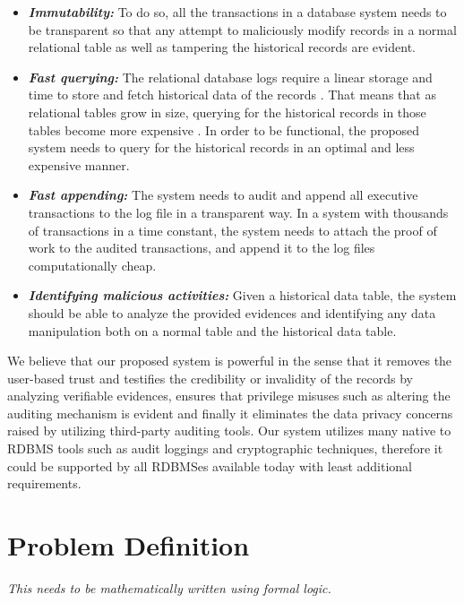 \begin{itemize}
  \item \textbf{\textit{Immutability:}} To do so, all the transactions in a database system needs to be transparent so that any attempt to maliciously modify records in a normal relational table as well as tampering the historical records are evident.
  \item \textbf{\textit{Fast querying:}} The relational database logs require a linear storage and time to store and fetch historical data of the records \cite{crosby2009tamper-evident}. That means that as relational tables grow in size, querying for the historical records in those tables become more expensive \cite{beirami2018snapshot}. In order to be functional, the proposed system needs to query for the historical records in an optimal and less expensive manner.\
  \item \textbf{\textit{Fast appending:}} The system needs to audit and append all executive transactions to the log file in a transparent way. In a system with thousands of transactions in a time constant, the system needs to attach the proof of work to the audited transactions, and append it to the log files computationally cheap.
  \item \textbf{\textit{Identifying malicious activities:}} Given a historical data table, the system should be able to analyze the provided evidences and identifying any data manipulation both on a normal table and the historical data table.
\end{itemize} 
We believe that our proposed system is powerful in the sense that it removes the user-based trust and testifies the credibility or invalidity of the records by analyzing verifiable evidences, ensures that privilege misuses such as altering the auditing mechanism is evident and finally it eliminates the data privacy concerns raised by utilizing third-party auditing tools. Our system utilizes many native to RDBMS tools such as audit loggings and cryptographic techniques, therefore it could be supported by all RDBMSes available today with least additional requirements.

\section{Problem Definition}

{\it This needs to be mathematically written using formal logic.}
